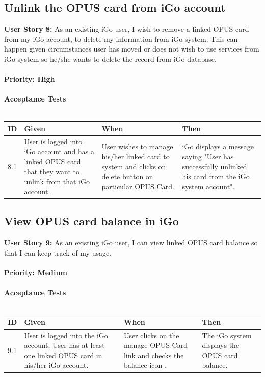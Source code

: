 \documentclass[11pt, english]{report}
\begin{document}
\vspace*{0.2in}
\subsection{Unlink the OPUS card from iGo account}
\textbf{User Story 8: }
 As an existing iGo user, I wish to remove a linked OPUS card from my iGo account, to delete my information from iGo system.
 This can happen given circumstances user has moved or does not wish to use services from iGo system so he/she wants to delete the record from iGo database.
\\ \\
\textbf{Priority: High}\\ \\
\textbf{Acceptance Tests} \\ \\ 
\setlength{\tabcolsep}{18pt}
\renewcommand{\arraystretch}{1.5}
\begin{tabular}{ |p{0.5cm}|p{3cm}|p{3.5cm}|p{5cm}| }
\hline
\textbf{ID} & \textbf{Given} & \textbf{When} & \textbf{Then}\\
\hline

8.1&
User is logged into iGo account and has a linked OPUS card that they want to unlink from that iGo account. &
User wishes to manage his/her linked card to system and clicks on delete button on particular OPUS Card. &
iGo displays a message saying "User has successfully unlinked his card from the iGo system account".
 \\
\hline
\end{tabular}

\subsection{View OPUS card balance in iGo}
\textbf{User Story 9: }
As an existing iGo user, I can view linked OPUS card balance so that I can keep track of my usage. 
\\ \\
\textbf{Priority: Medium}\\ \\
\textbf{Acceptance Tests} \\ \\ 
\setlength{\tabcolsep}{18pt}
\renewcommand{\arraystretch}{1.5}
\begin{tabular}{ |p{0.5cm}|p{3cm}|p{3.5cm}|p{5cm}| }
\hline
\textbf{ID} & \textbf{Given} & \textbf{When} & \textbf{Then}\\
\hline

9.1&
User is logged into the iGo account.
User has at least one linked OPUS card in his/her iGo account.&
User clicks on the manage OPUS Card link and checks the balance icon .&
The iGo system displays the OPUS card balance. 

 \\
\hline
\end{tabular}
\end{document}
